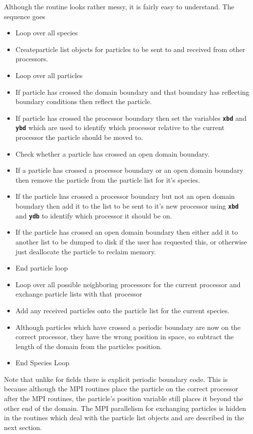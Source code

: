 \documentclass[12pt]{article}
\newcommand{\inlinecode}[1]{{\color{warwickred} \bf\texttt{#1}}}
\begin{document}
Although the routine looks rather messy, it is fairly easy to understand. The
sequence goes
\begin{itemize}
\item Loop over all species
\item Createparticle list objects for particles to be sent to and received from
  other processors.
\item Loop over all particles
\item If particle has crossed the domain boundary and that boundary has
  reflecting boundary conditions then reflect the particle.
\item If particle has crossed the processor boundary then set the variables
  \inlinecode{xbd} and \inlinecode{ybd} which are used to identify which
  processor relative to the current processor the particle should be moved to.
\item Check whether a particle has crossed an open domain boundary.
\item If a particle has crossed a processor boundary or an open domain boundary
  then remove the particle from the particle list for it's species.
\item If the particle has crossed a processor boundary but not an open domain
  boundary then add it to the list to be sent to it's new processor using
  \inlinecode{xbd} and \inlinecode{ydb} to identify which processor it should
  be on.
\item If the particle has crossed an open domain boundary then either add it to
  another list to be dumped to disk if the user has requested this, or
  otherwise just deallocate the particle to reclaim memory.
\item End particle loop
\item Loop over all possible neighboring processors for the current processor
  and exchange particle lists with that processor
\item Add any received particles onto the particle list for the current
  species.
\item Although particles which have crossed a periodic boundary are now on the
  correct processor, they have the wrong position in space, so subtract the
  length of the domain from the particles position.
\item End Species Loop
\end{itemize}

Note that unlike for fields there is explicit periodic boundary code. This is
because although the MPI routines place the particle on the correct processor
after the MPI routines, the particle's position variable still places it beyond
the other end of the domain. The MPI parallelism for exchanging particles is
hidden in the routines which deal with the particle list objects and are
described in the next section.
\pagebreak
\end{document}
